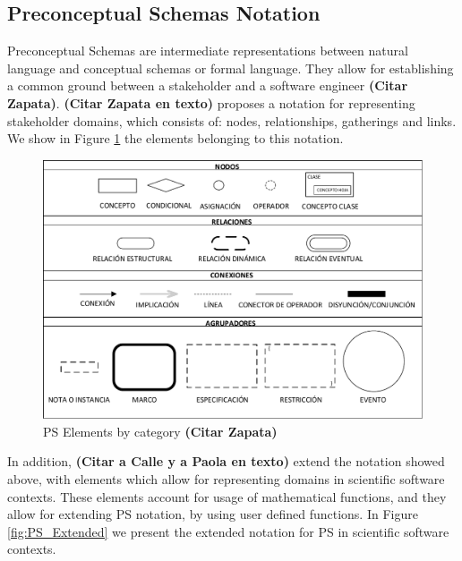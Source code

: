 \documentclass[review]{elsarticle}
\begin{document}
\subsection{Preconceptual Schemas Notation}
Preconceptual Schemas are intermediate representations between natural language and conceptual schemas or formal language. They allow for establishing a common ground between a stakeholder and a software engineer {\color{red} \textbf{(Citar Zapata)}}.{\color{red} \textbf{(Citar Zapata en texto)}} proposes a notation for representing stakeholder domains, which consists of: nodes, relationships, gatherings and links. We show in Figure \ref{fig:PS_Elements} the elements belonging to this notation.\\

\begin{figure}
	\centering
	\includegraphics[width=1.0\textwidth]{Figures/PSElements.pdf}
	\caption{PS Elements by category {\color{red} \textbf{(Citar Zapata)}}}
	\label{fig:PS_Elements}
\end{figure}

In addition, {\color{red} \textbf{(Citar a Calle y a Paola en texto)}} extend the notation showed above, with elements which allow for representing domains in scientific software contexts. These elements account for usage of mathematical functions, and they allow for extending PS notation, by using user defined functions. In Figure \ref{fig:PS_Extended} we present the extended notation for PS in scientific software contexts.
\end{document}
